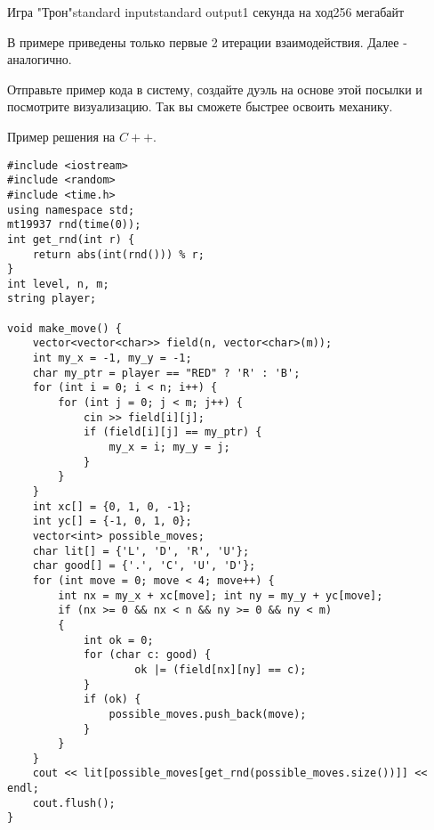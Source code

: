 \begin{problem}{Игра "Трон"}{standard input}{standard output}{1 секунда на ход}{256 мегабайт}
\Examples
\begin{example}
\end{example}

\Note 

\par В примере приведены только первые 2 итерации взаимодействия. Далее - аналогично.

\par Отправьте пример кода в систему, создайте дуэль на основе этой посылки и посмотрите визуализацию. Так вы сможете быстрее освоить механику.

\newpage
\par Пример решения на $C++$.
\begin{verbatim}
#include <iostream>
#include <random>
#include <time.h>
using namespace std;
mt19937 rnd(time(0));
int get_rnd(int r) {
    return abs(int(rnd())) % r;
}
int level, n, m;
string player;

void make_move() {
    vector<vector<char>> field(n, vector<char>(m));
    int my_x = -1, my_y = -1;
    char my_ptr = player == "RED" ? 'R' : 'B';
    for (int i = 0; i < n; i++) {
        for (int j = 0; j < m; j++) {
            cin >> field[i][j];
            if (field[i][j] == my_ptr) {
                my_x = i; my_y = j;
            }
        }
    }
    int xc[] = {0, 1, 0, -1};
    int yc[] = {-1, 0, 1, 0};
    vector<int> possible_moves;
    char lit[] = {'L', 'D', 'R', 'U'};
    char good[] = {'.', 'C', 'U', 'D'};
    for (int move = 0; move < 4; move++) {
        int nx = my_x + xc[move]; int ny = my_y + yc[move];
        if (nx >= 0 && nx < n && ny >= 0 && ny < m)
        {
            int ok = 0;
            for (char c: good) {
                    ok |= (field[nx][ny] == c);
            }
            if (ok) {
                possible_moves.push_back(move);
            }
        }
    }
    cout << lit[possible_moves[get_rnd(possible_moves.size())]] << endl;
    cout.flush();
}


\end{verbatim}
\end{problem}
